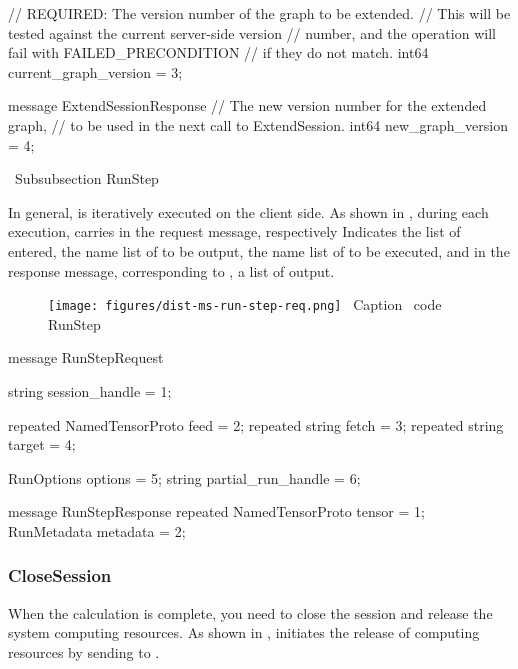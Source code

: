 \begin{content}
\begin{leftbar}
\begin{c++}
{  // REQUIRED: The version number of the graph to be extended. 
  // This will be tested against the current server-side version 
  // number, and the operation will fail with FAILED\_PRECONDITION 
  // if they do not match.
  int64 current_graph_version = 3;
}

message ExtendSessionResponse {
  // The new version number for the extended graph, 
  // to be used in the next call to ExtendSession.
  int64 new_graph_version = 4;
}
\end{c++}
\end{leftbar}

\ Subsubsection {} RunStep

In general,  is iteratively executed on the client side. As shown in , during each  execution,  carries  in the request message, respectively Indicates the list of  entered, the name list of  to be output, the name list of  to be executed, and  in the response message, corresponding to , a list of  output.

\begin{figure}[H]
\centering
\texttt{[image: figures/dist-ms-run-step-req.png]}
\ Caption {\ code RunStep {}}
 \label{fig:dist-ms-run-step-req}
\end{figure}

\begin{leftbar}
\begin{c++}
message RunStepRequest {
  string session_handle = 1;

  repeated NamedTensorProto feed = 2;
  repeated string fetch = 3;
  repeated string target = 4;

  RunOptions options = 5;
  string partial_run_handle = 6;
}

message RunStepResponse {
  repeated NamedTensorProto tensor = 1;
  RunMetadata metadata = 2;
}
\end{c++}
\end{leftbar}

\subsubsection{CloseSession}

When the calculation is complete, you need to close the session and release the system computing resources. As shown in ,  initiates the release of computing resources by sending  to .


\end{content}

